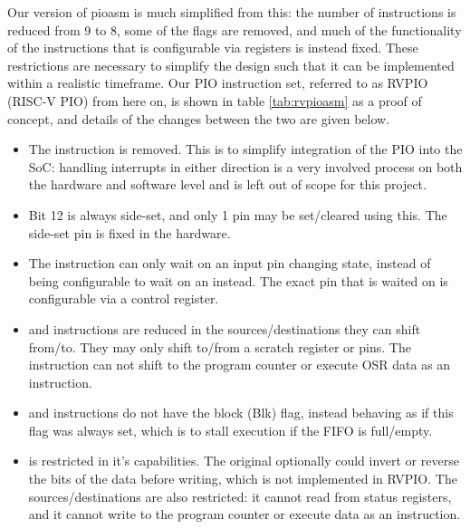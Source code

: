 Our version of pioasm is much simplified from this: the number of instructions is reduced from 9 to 8, some of the flags are removed, and much of the functionality of the instructions that is configurable via registers is instead fixed. These restrictions are necessary to simplify the design such that it can be implemented within a realistic timeframe. Our PIO instruction set, referred to as RVPIO (RISC-V PIO) from here on, is shown in table \ref{tab:rvpioasm} as a proof of concept, and details of the changes between the two are given below.

\begin{itemize}
    \item The  instruction is removed. This is to simplify integration of the PIO into the SoC: handling interrupts in either direction is a very involved process on both the hardware and software level and is left out of scope for this project.
    \item Bit 12 is always side-set, and only 1 pin may be set/cleared using this. The side-set pin is fixed in the hardware.
    \item The  instruction can only wait on an input pin changing state, instead of being configurable to wait on an  instead. The exact pin that is waited on is configurable via a control register.
    \item {} and  instructions are reduced in the sources/destinations they can shift from/to. They may only shift to/from a scratch register or pins. The  instruction can not shift to the program counter or execute OSR data as an instruction.
    \item {} and  instructions do not have the block (Blk) flag, instead behaving as if this flag was always set, which is to stall execution if the FIFO is full/empty.
    \item {} is restricted in it's capabilities. The original optionally could invert or reverse the bits of the data before writing, which is not implemented in RVPIO. The sources/destinations are also restricted: it cannot read from status registers, and it cannot write to the program counter or execute data as an instruction.
\end{itemize}


